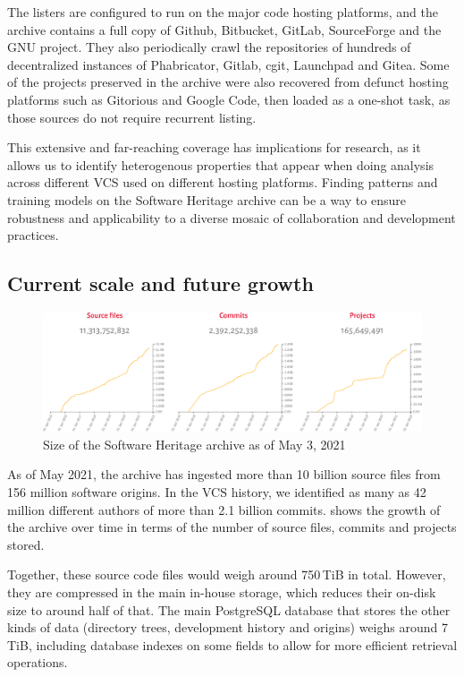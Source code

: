 The listers are configured to run on the major code hosting platforms, and the
archive contains a full copy of Github, Bitbucket, GitLab, SourceForge and the
GNU project. They also periodically crawl the repositories of hundreds of
decentralized instances of Phabricator, Gitlab, cgit, Launchpad and Gitea.
Some of the projects preserved in the archive were also recovered from defunct
hosting platforms such as Gitorious and Google Code, then loaded as a one-shot
task, as those sources do not require recurrent listing.

This extensive and far-reaching coverage has implications for research, as it
allows us to identify heterogenous properties that appear when doing analysis
across different \gls{VCS} used on different hosting platforms. Finding
patterns and training models on the Software Heritage archive can be a way to
ensure robustness and applicability to a diverse mosaic of collaboration and
development practices.

\subsection{Current scale and future growth}

\begin{figure}
    \centering
    \includegraphics[width=0.9\linewidth]{../img/swh-size}
    \caption{Size of the Software Heritage archive as of May 3, 2021}%
    \label{fig:swh-size}
\end{figure}

As of May 2021, the archive has ingested more than 10 billion source files from
156 million software origins. In the \gls{VCS} history, we identified as many
as 42 million different authors of more than 2.1 billion commits.
 shows the growth of the archive over time in terms of the
number of source files, commits and projects stored.

Together, these source code files would weigh around 750\,TiB in total.
However, they are compressed in the main in-house storage, which reduces their
on-disk size to around half of that. The main
PostgreSQL database that stores the other kinds of data (directory trees,
development history and origins) weighs around 7\,TiB, including database
indexes on some fields to allow for more efficient retrieval operations.

